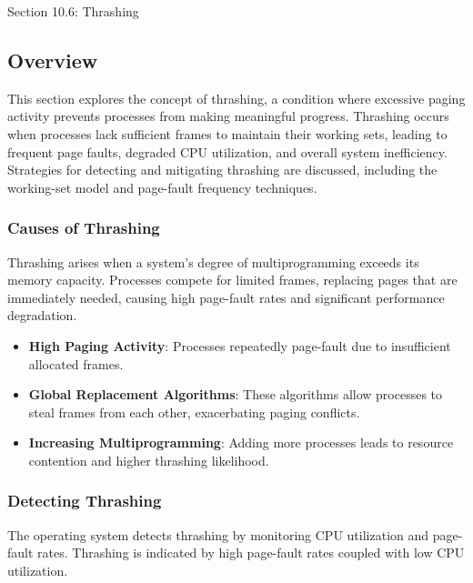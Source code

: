 \begin{notes}{Section 10.6: Thrashing}
    \subsection*{Overview}

    This section explores the concept of thrashing, a condition where excessive paging activity prevents processes from making meaningful progress. Thrashing occurs when processes lack sufficient frames 
    to maintain their working sets, leading to frequent page faults, degraded CPU utilization, and overall system inefficiency. Strategies for detecting and mitigating thrashing are discussed, including 
    the working-set model and page-fault frequency techniques.
    
    \subsubsection*{Causes of Thrashing}
    
    Thrashing arises when a system's degree of multiprogramming exceeds its memory capacity. Processes compete for limited frames, replacing pages that are immediately needed, causing high page-fault 
    rates and significant performance degradation.
    
    \begin{highlight}
        \begin{itemize}
            \item \textbf{High Paging Activity}: Processes repeatedly page-fault due to insufficient allocated frames.
            \item \textbf{Global Replacement Algorithms}: These algorithms allow processes to steal frames from each other, exacerbating paging conflicts.
            \item \textbf{Increasing Multiprogramming}: Adding more processes leads to resource contention and higher thrashing likelihood.
        \end{itemize}
    \end{highlight}
    
    \subsubsection*{Detecting Thrashing}
    
    The operating system detects thrashing by monitoring CPU utilization and page-fault rates. Thrashing is indicated by high page-fault rates coupled with low CPU utilization.
    

\end{notes}

